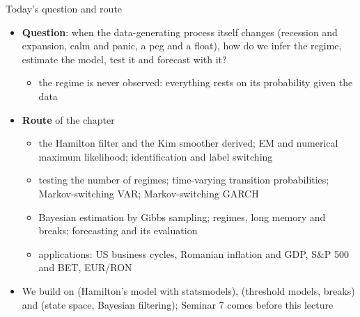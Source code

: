 \begin{frame}{Today's question and route}
\itemsize{\small}
\begin{itemize}
    \item \textbf{Question}: when the data-generating process itself changes (recession and expansion, calm and panic, a peg and a float), how do we infer the regime, estimate the model, test it and forecast with it?
    \begin{itemize}
        \item the regime is never observed: everything rests on its probability given the data
    \end{itemize}
    \item \textbf{Route} of the chapter
    \begin{itemize}
        \item the Hamilton filter and the Kim smoother derived; EM and numerical maximum likelihood; identification and label switching
        \item testing the number of regimes; time-varying transition probabilities; Markov-switching VAR; Markov-switching GARCH
        \item Bayesian estimation by Gibbs sampling; regimes, long memory and breaks; forecasting and its evaluation
        \item applications: US business cycles, Romanian inflation and GDP, S\&P 500 and BET, EUR/RON
    \end{itemize}
    \item We build on  (Hamilton's model with statsmodels),  (threshold models, breaks) and  (state space, Bayesian filtering); Seminar 7 comes before this lecture
\end{itemize}
\end{frame}

